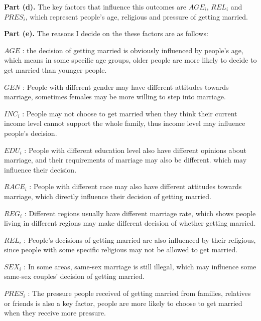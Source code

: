 \documentclass[letterpaper,12pt]{article}
\theoremstyle{definition}
\begin{document}
\noindent\textbf{Part (d).} The key factors that influence this outcomes are $AGE_{i}$, $REL_{i}$ and $PRES_{i}$, which represent people's age, religious and pressure of getting married.

\noindent\textbf{Part (e).} The reasons I decide on the these factors are as follows: 

\noindent  $AGE$ : the decision of getting married is obviously influenced by people's age, which means in some specific age groups, older people are more likely to decide to get married than younger people.

\noindent $GEN$ : People with different gender may have different attitudes towards marriage, sometimes females may be more willing to step into marriage.

\noindent $INC_{i}$ : People may not choose to get married when they think their current income level cannot support the whole family, thus income level may influence people's decision.

\noindent $EDU_{i}$ : People with different education level also have different opinions about marriage, and their requirements of marriage may also be different. which may influence their decision.

\noindent $RACE_{i}$ : People with different race may also have different attitudes towards marriage, which directly influence their decision of getting married.

\noindent $REG_{i}$ : Different regions usually have different marriage rate, which shows people living in different regions may make different decision of whether getting married.

\noindent $REL_{i}$ : People's decisions of getting married are also influenced by their religious, since people with some specific religious may not be allowed to get married.

\noindent $SEX_{i}$ : In some areas, same-sex marriage is still illegal, which may influence some same-sex couples' decision of getting married.

\noindent $PRES_{i}$ : The pressure people received of getting married from families, relatives or friends is also a key factor, people are more likely to choose to get married when they receive more pressure.
\end{document}
